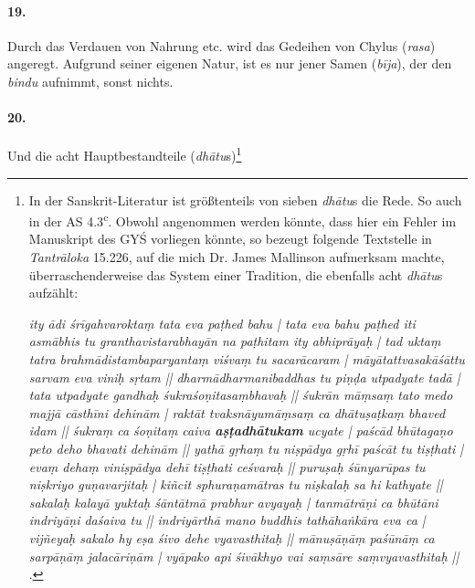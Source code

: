 \documentclass[a4paper,12pt]{article}
\begin{document}
\paragraph{19.} Durch das Verdauen von Nahrung etc. wird das Gedeihen von Chylus (\textit{rasa}) angeregt. Aufgrund seiner eigenen Natur, ist es nur jener Samen (\textit{bīja}), der den \textit{bindu} aufnimmt, sonst nichts. 

\paragraph{20.} Und die acht Hauptbestandteile (\textit{dhātu}s)\footnote{In der Sanskrit-Literatur ist größtenteils von sieben \textit{dhātu}s die Rede. So auch in der AS 4.3\textsuperscript{c}. Obwohl angenommen werden könnte, dass hier ein Fehler im Manuskript des GYŚ vorliegen könnte, so bezeugt folgende Textstelle in \textit{Tantrāloka} 15.226, auf die mich Dr. James Mallinson aufmerksam machte, überraschenderweise das System einer Tradition, die ebenfalls acht \textit{dhātu}s aufzählt:

  \textit{ity ādi śrīgahvaroktaṃ tata eva paṭhed bahu | tata eva bahu paṭhed iti asmābhis tu granthavistarabhayān na paṭhitam ity abhiprāyaḥ | tad uktaṃ tatra brahmādistambaparyantaṃ viśvaṃ tu sacarācaram | māyātattvasakāśāttu sarvam eva viniḥ sṛtam || dharmādharmanibaddhas tu piṇḍa utpadyate tadā | tata utpadyate gandhaḥ śukraśoṇitasaṃbhavaḥ || śukrān māṃsaṃ tato medo majjā cāsthīni dehinām | raktāt tvaksnāyumāṃsaṃ ca dhātuṣaṭkaṃ bhaved idam || śukraṃ ca śoṇitaṃ caiva \textbf{aṣṭadhātukam} ucyate | paścād bhūtagaṇo peto deho bhavati dehinām || yathā gṛhaṃ tu niṣpādya gṛhī paścāt tu tiṣṭhati | evaṃ dehaṃ viniṣpādya dehī tiṣṭhati ceśvaraḥ || puruṣaḥ śūnyarūpas tu niṣkriyo guṇavarjitaḥ | kiñcit sphuraṇamātras tu niṣkalaḥ sa hi kathyate || sakalaḥ kalayā yuktaḥ śāntātmā prabhur avyayaḥ | tanmātrāṇi ca bhūtāni indriyāṇi daśaiva tu || indriyārthā mano buddhis tathāhaṅkāra eva ca | vijñeyaḥ sakalo hy eṣa śivo dehe vyavasthitaḥ || mānuṣāṇāṃ paśūnāṃ ca sarpāṇāṃ jalacāriṇām | vyāpako api śivākhyo vai saṃsāre saṃvyavasthitaḥ ||}  \parencite{tantraloka}.

}
\end{document}
